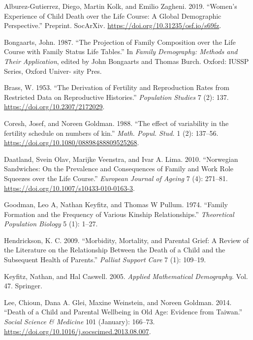 \documentclass[
]{article}
\newlength{\cslhangindent}
\newenvironment{cslreferences}%
  {\setlength{\parindent}{0pt}%
  \everypar{\setlength{\hangindent}{\cslhangindent}}\ignorespaces}%
  {\par}
\begin{document}
\hypertarget{refs}{}
\begin{cslreferences}
\leavevmode\hypertarget{ref-alburez_gutierrez_womens_2019}{}%
Alburez-Gutierrez, Diego, Martin Kolk, and Emilio Zagheni. 2019.
``Women's Experience of Child Death over the Life Course: A Global
Demographic Perspective.'' Preprint. SocArXiv.
\url{https://doi.org/10.31235/osf.io/s69fz}.

\leavevmode\hypertarget{ref-bongaarts_projection_1987}{}%
Bongaarts, John. 1987. ``The Projection of Family Composition over the
Life Course with Family Status Life Tables.'' In \emph{Family
Demography: Methods and Their Application}, edited by John Bongaarts and
Thomas Burch. Oxford: IUSSP Series, Oxford Univer- sity Pres.

\leavevmode\hypertarget{ref-brass_derivation_1953}{}%
Brass, W. 1953. ``The Derivation of Fertility and Reproduction Rates
from Restricted Data on Reproductive Histories.'' \emph{Population
Studies} 7 (2): 137. \url{https://doi.org/10.2307/2172029}.

\leavevmode\hypertarget{ref-Coresh1988}{}%
Coresh, Josef, and Noreen Goldman. 1988. ``The effect of variability in
the fertility schedule on numbers of kin.'' \emph{Math. Popul. Stud.} 1
(2): 137--56. \url{https://doi.org/10.1080/08898488809525268}.

\leavevmode\hypertarget{ref-daatland_norwegian_2010}{}%
Daatland, Svein Olav, Marijke Veenstra, and Ivar A. Lima. 2010.
``Norwegian Sandwiches: On the Prevalence and Consequences of Family and
Work Role Squeezes over the Life Course.'' \emph{European Journal of
Ageing} 7 (4): 271--81. \url{https://doi.org/10.1007/s10433-010-0163-3}.

\leavevmode\hypertarget{ref-goodman1974}{}%
Goodman, Leo A, Nathan Keyfitz, and Thomas W Pullum. 1974. ``Family
Formation and the Frequency of Various Kinship Relationships.''
\emph{Theoretical Population Biology} 5 (1): 1--27.

\leavevmode\hypertarget{ref-Hendrickson2009}{}%
Hendrickson, K. C. 2009. ``Morbidity, Mortality, and Parental Grief: A
Review of the Literature on the Relationship Between the Death of a
Child and the Subsequent Health of Parents.'' \emph{Palliat Support
Care} 7 (1): 109--19.

\leavevmode\hypertarget{ref-KeyfitzMath}{}%
Keyfitz, Nathan, and Hal Caswell. 2005. \emph{Applied Mathematical
Demography}. Vol. 47. Springer.

\leavevmode\hypertarget{ref-lee_death_2014}{}%
Lee, Chioun, Dana A. Glei, Maxine Weinstein, and Noreen Goldman. 2014.
``Death of a Child and Parental Wellbeing in Old Age: Evidence from
Taiwan.'' \emph{Social Science \& Medicine} 101 (January): 166--73.
\url{https://doi.org/10.1016/j.socscimed.2013.08.007}.


\end{cslreferences}
\end{document}

